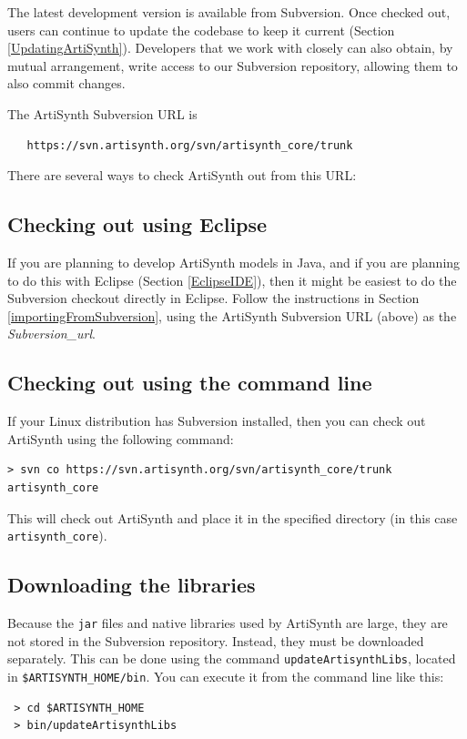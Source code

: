 \documentclass{article}
\def\SEP{/}
\def\SYSTEM{Linux }
\def\directory{directory }
\begin{document}
The latest development version is available from Subversion. Once
checked out, users can continue to update the codebase to keep it
current (Section \ref{UpdatingArtiSynth}). Developers that we work
with closely can also obtain, by mutual arrangement, write access to
our Subversion repository, allowing them to also commit changes.

The ArtiSynth Subversion URL is
\begin{verbatim}
   https://svn.artisynth.org/svn/artisynth_core/trunk
\end{verbatim}
There are several ways to check ArtiSynth out from this URL:

\subsection{Checking out using Eclipse}
\label{ArtiSynthEclipseCheckout}

If you are planning to develop ArtiSynth models in Java, and if you
are planning to do this with Eclipse (Section \ref{EclipseIDE}), then
it might be easiest to do the Subversion checkout directly in Eclipse.
Follow the instructions in Section \ref{importingFromSubversion},
using the ArtiSynth Subversion URL (above) as the {\it
Subversion\_url}.

\subsection{Checking out using the command line}
\label{ArtiSynthCygwinCheckout}

If your \SYSTEM distribution has Subversion installed, then you can
check out ArtiSynth using the following command:

\begin{lstlisting}
> svn co https://svn.artisynth.org/svn/artisynth_core/trunk artisynth_core
\end{lstlisting}

This will check out ArtiSynth and place it in the specified \directory 
(in this case {\tt artisynth\_core}).

\subsection{Downloading the libraries}
\label{DownloadingLibraries}

Because the {\tt jar} files and native libraries used by ArtiSynth
are large, they are not stored in the Subversion repository.
Instead, they must be downloaded separately. This can be
done using the command {\tt updateArtisynthLibs}, located
in {\tt \$ARTISYNTH\_HOME\SEP bin}. You can execute it
from the command line like this:
\begin{verbatim}
 > cd $ARTISYNTH_HOME
 > bin/updateArtisynthLibs
\end{verbatim}
\end{document}
